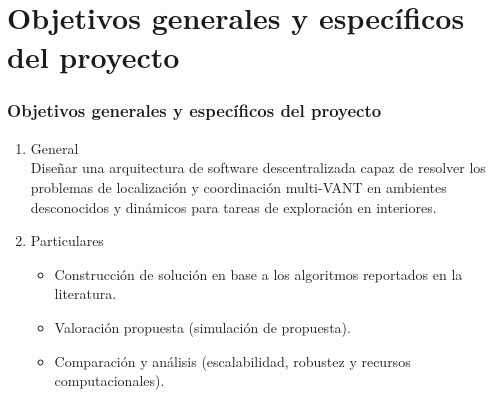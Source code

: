 \documentclass[
	12pt, %
	aspectratio=169, %
]{beamer}
\begin{document}

\section{Objetivos generales y específicos del proyecto}

\begin{frame}
  
  \frametitle{Objetivos generales y específicos del proyecto}

  \begin{enumerate}
  \item<1-> General \\

    Diseñar una arquitectura de software descentralizada capaz de resolver los problemas de localización y coordinación multi-VANT en ambientes desconocidos y dinámicos para tareas de exploración en interiores.
        
  \item<2-> Particulares\\

    \begin{itemize}
    \item<1-> Construcción de solución en base a los algoritmos reportados en la literatura.
    \item<2-> Valoración propuesta (simulación de propuesta).
    \item<3-> Comparación y análisis (escalabilidad, robustez y recursos computacionales).
    \end{itemize}
    
  \end{enumerate}
\end{frame}

\end{document}
